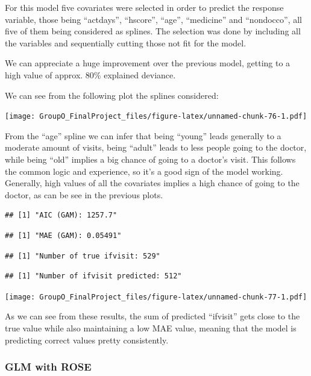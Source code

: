 \documentclass[
]{article}
\begin{document}
For this model five covariates were selected in order to predict the
response variable, those being ``actdays'', ``hscore'', ``age'',
``medicine'' and ``nondocco'', all five of them being considered as
splines. The selection was done by including all the variables and
sequentially cutting those not fit for the model.

We can appreciate a huge improvement over the previous model, getting to
a high value of approx. 80\% explained deviance.

We can see from the following plot the splines considered:

\texttt{[image: GroupO\_FinalProject\_files/figure-latex/unnamed-chunk-76-1.pdf]}

From the ``age'' spline we can infer that being ``young'' leads
generally to a moderate amount of visits, being ``adult'' leads to less
people going to the doctor, while being ``old'' implies a big chance of
going to a doctor's visit. This follows the common logic and experience,
so it's a good sign of the model working. Generally, high values of all
the covariates implies a high chance of going to the doctor, as can be
see in the previous plots.

\begin{verbatim}
## [1] "AIC (GAM): 1257.7"
\end{verbatim}

\begin{verbatim}
## [1] "MAE (GAM): 0.05491"
\end{verbatim}

\begin{verbatim}
## [1] "Number of true ifvisit: 529"
\end{verbatim}

\begin{verbatim}
## [1] "Number of ifvisit predicted: 512"
\end{verbatim}

\texttt{[image: GroupO\_FinalProject\_files/figure-latex/unnamed-chunk-77-1.pdf]}

As we can see from these results, the sum of predicted ``ifvisit'' gets
close to the true value while also maintaining a low MAE value, meaning
that the model is predicting correct values pretty consistently.

\subsubsection{GLM with ROSE}\label{glm-with-rose}
\end{document}
